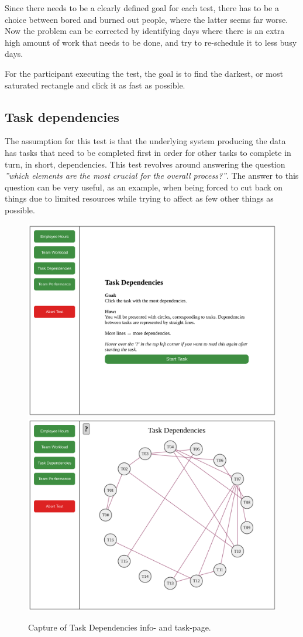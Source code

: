 {    Since there needs to be a clearly defined goal for each test, there has
    to be a choice between bored and burned out people, where the latter
    seems far worse. Now the problem can be corrected by identifying days
    where there is an extra high amount of work that needs to be done, and
    try to re-schedule it to less busy days.

    For the participant executing the test, the goal is to find the
    darkest, or most saturated rectangle and click it as fast as possible.

  \newpage
  \subsection{Task dependencies}

    \textit{\ideaThree}

    The assumption for this test is that the underlying system producing
    the data has tasks that need to be completed first in order for other
    tasks to complete in turn, in short, dependencies. This test revolves
    around answering the question
    \textit{''which elements are the most crucial for the overall
      process?''}. The answer to this question can be very useful, as an
    example, when being forced to cut back on things due to limited
    resources while trying to affect as few other things as possible.

    \begin{figure}[h!]
      \centering
      \includegraphics[width=.49\textwidth]{figures/captures/webapp_dependencies_info.pdf}
      \includegraphics[width=.49\textwidth]{figures/captures/webapp_dependencies_task.pdf}
      \caption{Capture of Task Dependencies info- and task-page.}
    \end{figure}

}
